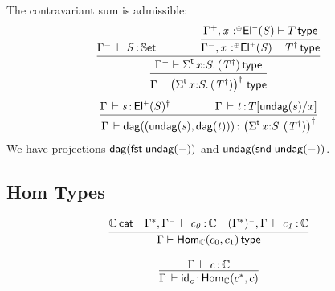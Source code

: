 \documentclass[11pt]{article}
\theoremstyle{plain}
\begin{document}
The contravariant sum is admissible:
\begin{equation}
	\infer{
		\wftp{ \Gamma }{ \paren{\sigmatp{x}{S}{(T^\dagger)}}^\dagger }
	}{
		\infer{
			\wftp{ \Gamma^- }{ \sigmatp{x}{S}{(T^\dagger)} }
		}{
			\ofdtp{ \Gamma^- }{ S }{ \types }
			\qquad \qquad
			\infer{
				\wftp{\Gamma^-, \tptmv{x}{\coc}{\Elp S}}{T^\dagger}
			}{
				\wftp{\Gamma^+, \tptmv{x}{\conc}{\Elp S}}{T}
			}
		}	
	}
\end{equation}
\begin{equation}
	\infer{
		\oftp{\Gamma}{\dagtm{(\undag s, \dagtm t)}}{ \paren{\sigmatp{x}{S}{(T^\dagger)}}^\dagger }
	}{
		\oftp{\Gamma}{s}{\Elp S^\dagger}
		\qquad \qquad
		\oftp{\Gamma}{t}{\subst T {\undag s} x}
	}
\end{equation}
We have projections $\mathsf{dag}(\mathit{\mathsf{fst}_{} \: \mathsf{undag}(-)})$ and $\mathsf{undag}(\mathit{\mathsf{snd}_{} \: \mathsf{undag}(-)})$.

\subsection{Hom Types}

\[
\begin{array}{c}
\infer{\wftp{\Gamma}{\Hom{\C}{c_0}{c_1}}}
      {\wfdtp{\C} &
        \oftp{\Gamma^*,\Gamma^\con}{c_0}{\C} & 
        \oftp{(\Gamma^*)^\con,\Gamma}{c_1}{\C} 
      }
\\ \\
\infer{\oftp{\Gamma}{\idm{c}}{\Hom{\C}{c^*}{c}}}
      {\oftp{\Gamma}{c}{\C}
      }
\end{array}
\]

\end{document}
